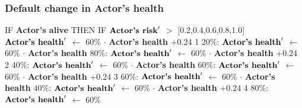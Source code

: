 \documentclass{article}%
\begin{document}
\subsubsection{Default change in Actor's health}%
\label{ssubsec:Default change in Actor's health}%
\begin{flushleft}%
IF %
\textbf{Actor's alive}%
\linebreak%
\hspace*{2em}%
THEN %
IF %
$\mbox{\textbf{Actor's risk}} '$%
$>$%
{[}0.2,0.4,0.6,0.8,1.0{]}%
\linebreak%
\hspace*{4em}%
$\mbox{\textbf{Actor's health}} '$%
$\leftarrow$%
60\%%
$\cdot$%
\textbf{Actor's health}%
+0.24%
\linebreak%
\hspace*{4em}%
1 %
\linebreak%
\hspace*{6em}%
20\%: %
$\mbox{\textbf{Actor's health}} '$%
$\leftarrow$%
60\%%
$\cdot$%
\textbf{Actor's health}%
\linebreak%
\hspace*{6em}%
80\%: %
$\mbox{\textbf{Actor's health}} '$%
$\leftarrow$%
60\%%
$\cdot$%
\textbf{Actor's health}%
+0.24%
\linebreak%
\hspace*{4em}%
2 %
\linebreak%
\hspace*{6em}%
40\%: %
$\mbox{\textbf{Actor's health}} '$%
$\leftarrow$%
60\%%
$\cdot$%
\textbf{Actor's health}%
\linebreak%
\hspace*{6em}%
60\%: %
$\mbox{\textbf{Actor's health}} '$%
$\leftarrow$%
60\%%
$\cdot$%
\textbf{Actor's health}%
+0.24%
\linebreak%
\hspace*{4em}%
3 %
\linebreak%
\hspace*{6em}%
60\%: %
$\mbox{\textbf{Actor's health}} '$%
$\leftarrow$%
60\%%
$\cdot$%
\textbf{Actor's health}%
\linebreak%
\hspace*{6em}%
40\%: %
$\mbox{\textbf{Actor's health}} '$%
$\leftarrow$%
60\%%
$\cdot$%
\textbf{Actor's health}%
+0.24%
\linebreak%
\hspace*{4em}%
4 %
\linebreak%
\hspace*{6em}%
80\%: %
$\mbox{\textbf{Actor's health}} '$%
$\leftarrow$%
60\%%

\end{flushleft}
\end{document}
